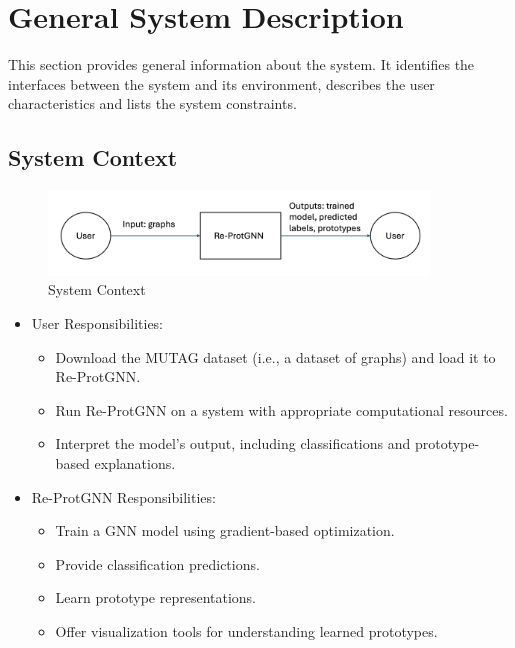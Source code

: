 \documentclass[12pt]{article}
\begin{document}
\section{General System Description}

This section provides general information about the system.  It identifies the
interfaces between the system and its environment, describes the user
characteristics and lists the system constraints.

\subsection{System Context}


\begin{figure}[h!]
\begin{center}
 \includegraphics[width=0.9\textwidth]{SystemContextFigure}
\caption{System Context}
\label{Fig_SystemContext} 
\end{center}
\end{figure}

\begin{itemize}
\item User Responsibilities:
\begin{itemize}
\item Download the MUTAG dataset (i.e., a dataset of graphs) \cite{debnath1991structure} and load it to Re-ProtGNN. 
\item Run Re-ProtGNN on a system with appropriate computational resources.
\item Interpret the model’s output, including classifications and prototype-based explanations.
\end{itemize}
\item Re-ProtGNN Responsibilities:
\begin{itemize}
\item Train a GNN model using gradient-based optimization.
\item Provide classification predictions.
\item Learn prototype representations.
\item Offer visualization tools for understanding learned prototypes.
\end{itemize}
\end{itemize}
\end{document}
